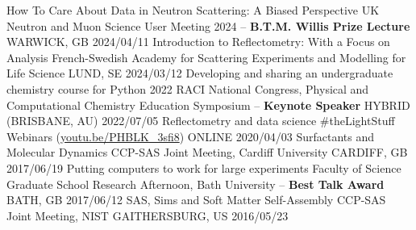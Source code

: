 \vspace{-0.4cm}
\begin{cvhonors}
  \cvhonor
    {How To Care About Data in Neutron Scattering: A Biased Perspective}
    {UK Neutron and Muon Science User Meeting 2024 -- \textbf{B.T.M. Willis Prize Lecture}}
    {WARWICK, GB}
    {2024/04/11}
  \cvhonor
    {Introduction to Reflectometry: With a Focus on Analysis}
    {French-Swedish Academy for Scattering Experiments and Modelling for Life Science}
    {LUND, SE}
    {2024/03/12}
  \cvhonor
    {Developing and sharing an undergraduate chemistry course for Python}
    {2022 RACI National Congress, Physical and Computational Chemistry Education Symposium -- \textbf{Keynote Speaker}}
    {HYBRID (BRISBANE, AU)}
    {2022/07/05}
  \cvhonor
    {Reflectometry and data science}
    {\#theLightStuff Webinars (\href{https://youtu.be/PHBLK_3sfi8}{youtu.be/PHBLK\_3sfi8})}
    {ONLINE}
    {2020/04/03}
  \cvhonor
    {Surfactants and Molecular Dynamics}
    {CCP-SAS Joint Meeting, Cardiff University}
    {CARDIFF, GB}
    {2017/06/19}
  \cvhonor
    {Putting computers to work for large experiments}
    {Faculty of Science Graduate School Research Afternoon, Bath University -- \textbf{Best Talk Award}}
    {BATH, GB}
    {2017/06/12}
  \cvhonor
    {SAS, Sims and Soft Matter Self-Assembly}
    {CCP-SAS Joint Meeting, NIST}
    {GAITHERSBURG, US}
    {2016/05/23}
\end{cvhonors}
